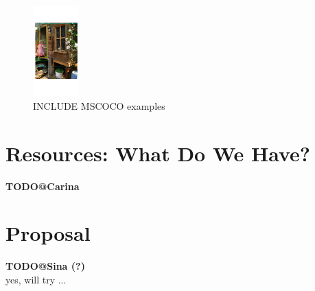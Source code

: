 \documentclass[runningheads]{llncs}
\begin{document}
\begin{figure}
	\centering
	\includegraphics[height=3.5cm]{fig/flickr_1000268201_boxes}
	\caption{INCLUDE MSCOCO examples}
	\label{fig:example}
\end{figure}

\section{Resources: What Do We Have?}
\label{sec:resources}
\textbf{TODO@Carina}\\



\section{Proposal}
\label{sec:future_proposal}
\textbf{TODO@Sina (?)}\\


yes, will try ...

\clearpage


\end{document}
